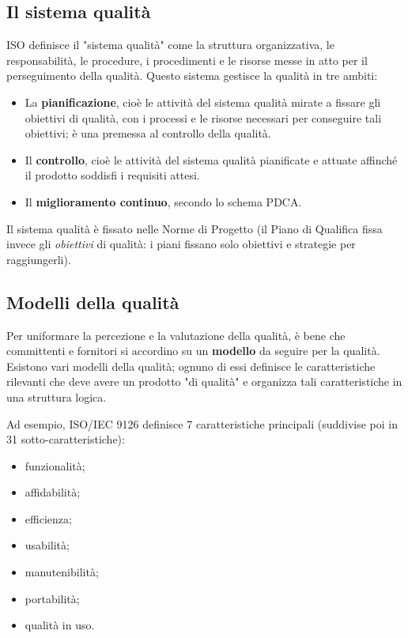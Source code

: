 \documentclass[a4paper]{article}
\begin{document}
		
	\subsection{Il sistema qualità}

		
ISO definisce il "sistema qualità" come la struttura organizzativa, le responsabilità, le procedure, i procedimenti e le risorse messe in atto per il perseguimento della qualità. Questo sistema gestisce la qualità in tre ambiti:
		
	\begin{itemize}
		
			
	\item La \textbf{pianificazione}, cioè le attività del sistema qualità mirate a fissare gli obiettivi di qualità, con i processi e le risorse necessari per conseguire tali obiettivi; è una premessa al controllo della qualità.
			
	\item Il \textbf{controllo}, cioè le attività del sistema qualità pianificate e attuate affinché il prodotto soddisfi i requisiti attesi.
			
	\item Il \textbf{miglioramento continuo}, secondo lo schema PDCA.
		
	\end{itemize}

		
Il sistema qualità è fissato nelle Norme di Progetto (il Piano di Qualifica fissa invece gli \emph{obiettivi} di qualità: i piani fissano solo obiettivi e strategie per raggiungerli).%


		
	\subsection{Modelli della qualità}

		
Per uniformare la percezione e la valutazione della qualità, è bene che committenti e fornitori si accordino su un \textbf{modello} da seguire per la qualità. Esistono vari modelli della qualità; ognuno di essi definisce le caratteristiche rilevanti che deve avere un prodotto "di qualità" e organizza tali caratteristiche in una struttura logica.
		
Ad esempio, ISO/IEC 9126 definisce 7 caratteristiche principali (suddivise poi in 31 sotto-caratteristiche):
		
	\begin{itemize}
		
			
	\item funzionalità;
			
	\item affidabilità;
			
	\item efficienza;
			
	\item usabilità;
			
	\item manutenibilità;
			
	\item portabilità;
			
	\item qualità in uso.
		
	\end{itemize}
\end{document}
